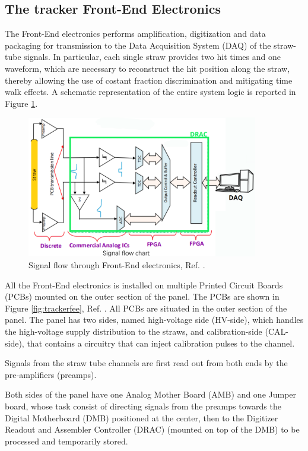 \subsection{The tracker Front-End Electronics}\label{tfee}
The Front-End electronics performs amplification, digitization and data packaging 
for transmission to the Data Acquisition System (DAQ) of the straw-tube signals. 
In particular, each single straw provides two hit times and one waveform, 
which are necessary to reconstruct the hit position along the straw, 
thereby allowing the use of costant fraction discrimination and mitigating time walk effects. 
A schematic representation of the entire system logic is reported in Figure \ref{fig:flowfee}.
\begin{figure}[!h]
    \centering
    \includegraphics[width =0.9\textwidth]{figures/png/Screenshot_20240529_133230.png}
    \caption[Signal flow through Front-End electronics.]{Signal flow through Front-End electronics, Ref. \cite{bartoszek2015mu2e}.}
    \label{fig:flowfee}
    \end{figure}
All the Front-End electronics is installed on multiple Printed Circuit Boards 
(PCBs) mounted on the outer section of the panel. 
The PCBs are shown in Figure \ref{fig:trackerfee}, Ref. \cite{vadimmu2e}.
All PCBs are situated in the outer section of the panel. 
The panel has two sides, named high-voltage side (HV-side), 
which handles the high-voltage supply distribution to the straws, and 
calibration-side (CAL-side), that contains a circuitry that can inject calibration
pulses to the channel.

Signals from the straw tube channels are first read 
out from both ends by the pre-amplifiers (preamps).

Both sides of the panel have one Analog Mother Board (AMB) and one Jumper board, 
whose task consist of directing signals from the preamps towards the Digital 
Motherboard (DMB) positioned at the center, then to the Digitizer Readout and 
Assembler Controller (DRAC) (mounted on top of the DMB) to be processed and 
temporarily stored. 

